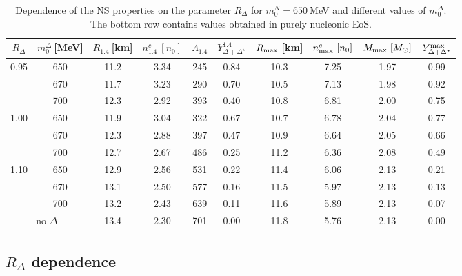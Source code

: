 \documentclass[preprint,showkeys,lengthcheck,nofootinbib,twocolumn,notitlepage,floatfix,superscriptaddress]{revtex4-1}
\begin{document}
\begin{table*}[t!]\centering\begin{tabular}{|c|c||c|c|c|c||c|c|c|c|}
  \hline
  $R_\Delta$ & $m_0^\Delta~$[MeV] & $R_{1.4}~$[km] & $n^c_{1.4}~[n_0]$ & $\Lambda_{1.4}$ & $Y^{1.4}_{\Delta+ \Delta^\star}$ & $R_{\rm max}~$[km] &$n^c_{\rm max}~[n_0]$ & $M_{\rm max}~[M_\odot]$ & $Y^{\rm max}_{\Delta + \Delta^\star}$ \\ \hline\hline
    \multirow{3}{*}{0.95} & 650         & 11.2 & 3.34 & 245 & 0.84 & 10.3 & 7.25 & 1.97 & 0.99 \\ \cline{2-9}
                          & 670         & 11.7 & 3.23 & 290 & 0.70 & 10.5 & 7.13 & 1.98 & 0.92 \\ \cline{2-9}
                          & 700         & 12.3 & 2.92 & 393 & 0.40 & 10.8 & 6.81 & 2.00 & 0.75 \\ \hline\hline
    \multirow{3}{*}{1.00} & 650         & 11.9 & 3.04 & 322 & 0.67 & 10.7 & 6.78 & 2.04 & 0.77 \\ \cline{2-9}
                          & 670         & 12.3 & 2.88 & 397 & 0.47 & 10.9 & 6.64 & 2.05 & 0.66 \\ \cline{2-9}
                          & 700         & 12.7 & 2.67 & 486 & 0.25 & 11.2 & 6.36 & 2.08 & 0.49 \\ \hline\hline
    \multirow{3}{*}{1.10} & 650         & 12.9 & 2.56 & 531 & 0.22 & 11.4 & 6.06 & 2.13 & 0.21 \\ \cline{2-9}
                          & 670         & 13.1 & 2.50 & 577 & 0.16 & 11.5 & 5.97 & 2.13 & 0.13 \\ \cline{2-9}
                          & 700         & 13.2 & 2.43 & 639 & 0.11 & 11.6 & 5.89 & 2.13 & 0.07 \\ \hline\hline
    \multicolumn{2}{|c||}{no $\Delta$}  & 13.4 & 2.30 & 701 & 0.00 & 11.8 & 5.76 & 2.13 & 0.00 \\ \hline
  \end{tabular}
  \caption{Dependence of the NS properties on the parameter $R_\Delta$ for $m_0^N=650~$MeV and different values of $m_0^\Delta$. The bottom row contains values obtained in purely nucleonic EoS.}
  \label{tab:delta_rep_m_r}
\end{table*}


\subsection{\texorpdfstring{$R_\Delta$}{} dependence}
\label{sec:repulsion_delta}
\end{document}
